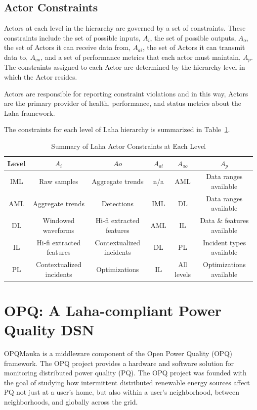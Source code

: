 \subsection{Actor Constraints}\label{subsec:actor-constraints}
Actors at each level in the hierarchy are governed by a set of constraints. These constraints include the set of possible inputs, $A_i$, the set of possible outputs, $A_o$, the set of Actors it can receive data from, $A_{ai}$, the set of Actors it can transmit data to, $A_{ao}$, and a set of performance metrics that each actor must maintain, $A_p$. The constraints assigned to each Actor are determined by the hierarchy level in which the Actor resides.

Actors are responsible for reporting constraint violations and in this way, Actors are the primary provider of health, performance, and status metrics about the Laha framework.

The constraints for each level of Laha hierarchy is summarized in Table~\ref{actor-constraint-table}.

\begin{table}
	\centering
	\caption{Summary of Laha Actor Constraints at Each Level}
	\begin{tabular}{|c|c|c|c|c|c|}
		\hline
		Level & $A_i$ & $Ao$ & $A_{ai}$ & $A_{ao}$ & $A_p$ \\
		\hline
		IML & Raw samples & Aggregate trends & n/a & AML & Data ranges available \\
		\hline
		AML & Aggregate trends & Detections & IML & DL & Data ranges available \\
		\hline
		DL & Windowed waveforms & Hi-fi extracted features & AML & IL & Data \& features available \\
		\hline
		IL & Hi-fi extracted features & Contextualized incidents & DL & PL & Incident types available \\
		\hline
		PL & Contextualized incidents & Optimizations & IL & All levels & Optimizations available \\
		\hline
	\end{tabular}
	\label{actor-constraint-table}
\end{table}

\section{OPQ: A Laha-compliant Power Quality DSN}\label{sec:opq:-a-laha-compliant-power-quality-dsn}
OPQMauka is a middleware component of the Open Power Quality (OPQ) framework. The OPQ project provides a hardware and software solution for monitoring distributed power quality (PQ). The OPQ project was founded with the goal of studying how intermittent distributed renewable energy sources affect PQ not just at a user's home, but also within a user's neighborhood, between neighborhoods, and globally across the grid.

